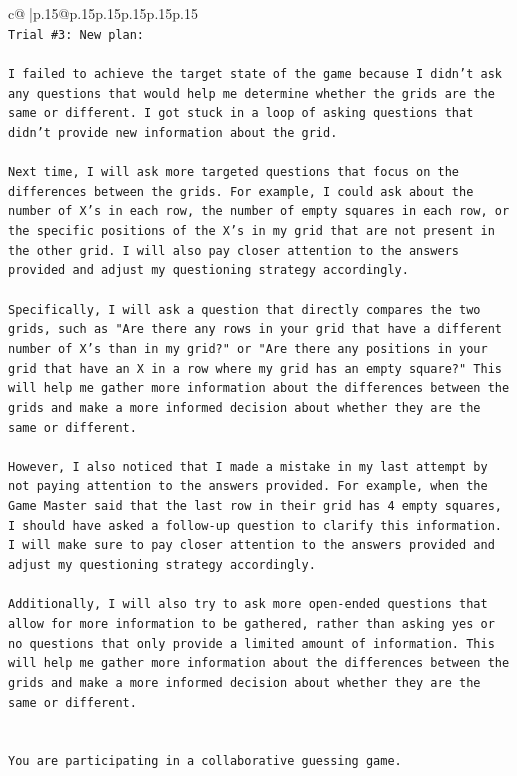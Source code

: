 \documentclass{article}
\begin{document}
{\begin{supertabular}{c@{$\;$}|p{.15\linewidth}@{}p{.15\linewidth}p{.15\linewidth}p{.15\linewidth}p{.15\linewidth}p{.15\linewidth}}
{{{\\ 
\texttt{Trial \#3: New plan: } \\
\\ 
\texttt{I failed to achieve the target state of the game because I didn't ask any questions that would help me determine whether the grids are the same or different. I got stuck in a loop of asking questions that didn't provide new information about the grid. } \\
\\ 
\texttt{Next time, I will ask more targeted questions that focus on the differences between the grids. For example, I could ask about the number of X's in each row, the number of empty squares in each row, or the specific positions of the X's in my grid that are not present in the other grid. I will also pay closer attention to the answers provided and adjust my questioning strategy accordingly. } \\
\\ 
\texttt{Specifically, I will ask a question that directly compares the two grids, such as "Are there any rows in your grid that have a different number of X's than in my grid?" or "Are there any positions in your grid that have an X in a row where my grid has an empty square?" This will help me gather more information about the differences between the grids and make a more informed decision about whether they are the same or different.} \\
\\ 
\texttt{However, I also noticed that I made a mistake in my last attempt by not paying attention to the answers provided. For example, when the Game Master said that the last row in their grid has 4 empty squares, I should have asked a follow{-}up question to clarify this information. I will make sure to pay closer attention to the answers provided and adjust my questioning strategy accordingly.} \\
\\ 
\texttt{Additionally, I will also try to ask more open{-}ended questions that allow for more information to be gathered, rather than asking yes or no questions that only provide a limited amount of information. This will help me gather more information about the differences between the grids and make a more informed decision about whether they are the same or different.} \\
\\ 
\\ 
\texttt{You are participating in a collaborative guessing game.} \\
}}}
\end{supertabular}}
\end{document}
